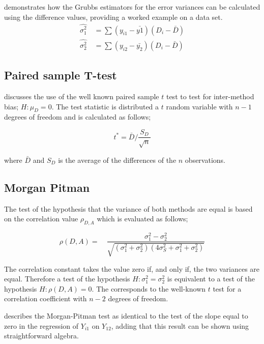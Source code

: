 \documentclass[12pt, a4paper]{article}
\begin{document}
\citet{Kinsella} demonstrates how the Grubbs estimators for the
error variances can be calculated using the difference values,
providing a worked example on a data set.
\begin{eqnarray}
\hat{\sigma^{2}_{1}}
\quad=\sum{(y_{i1}-\bar{y{1}})(D_{i}-\bar{D})}\\
\hat{\sigma^{2}_{2}} \quad=
\sum{(y_{i2}-\bar{y_{2}})(D_{i}-\bar{D})} \nonumber
\end{eqnarray}

\subsection{Paired sample T-test} \citet{Bartko} discusses the use
of the well known paired sample $t$ test to test for inter-method
bias; $H: \mu_{D}=0$. The test statistic is distributed a $t$
random variable with $n-1$ degrees of freedom and is calculated as
follows;

\begin{equation}
t^{*} = \bar{D}/ \frac{S_{D}}{\sqrt{n}}
\end{equation}

where $\bar{D}$ and $S_{D}$ is the average of the differences of
the $n$ observations.

\subsection{Morgan Pitman}

The test of the hypothesis that the variance of both methods are
equal is based on the correlation value $\rho_{D,A}$ which is
evaluated as follows;

\begin{equation}
\rho(D,A)=\quad\frac{\sigma^{2}_{1}-\sigma^{2}_{2}}{\sqrt{(\sigma^{2}_{1}+\sigma^{2}_{2})(4\sigma^{2}_{S}+\sigma^{2}_{1}+\sigma^{2}_{2})}}
\end{equation}

The correlation constant takes the value zero if, and only if, the
two variances are equal. Therefore a test of the hypothesis $H:
\sigma^{2}_{1}=\sigma^{2}_{2}$ is equivalent to a test of the
hypothesis $H: \rho(D,A) = 0$. The corresponds to the well-known
$t$ test for a correlation coefficient with $n-2$ degrees of
freedom.

\citet{Bartko} describes the Morgan-Pitman test as identical to
the test of the slope equal to zero in the regression of $Y_{i1}$
on $Y_{12}$, adding that this result can be shown using
straightforward algebra.
\end{document}
